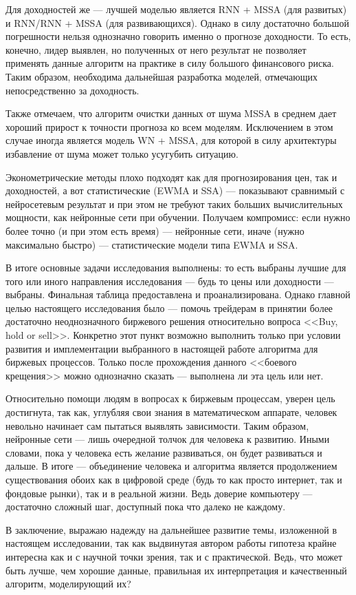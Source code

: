 Для доходностей же --- лучшей моделью является RNN + MSSA (для развитых) и RNN/RNN + MSSA (для развивающихся). Однако в силу достаточно большой погрешности нельзя однозначно говорить именно о прогнозе доходности. То есть, конечно, лидер выявлен, но полученных от него результат не позволяет применять данные алгоритм на практике в силу большого финансового риска. Таким образом, необходима дальнейшая разработка моделей, отмечающих непосредственно за доходность.

Также отмечаем, что алгоритм очистки данных от шума MSSA в среднем дает хороший прирост к точности прогноза ко всем моделям. Исключением в этом случае иногда является модель WN + MSSA, для которой в силу архитектуры избавление от шума может только усугубить ситуацию.

Эконометрические методы плохо подходят как для прогнозирования цен, так и доходностей, а вот статистические (EWMA и SSA) --- показывают сравнимый с нейросетевым результат и при этом не требуют таких больших вычислительных мощности, как нейронные сети при обучении. Получаем компромисс: если нужно более точно (и при этом есть время) --- нейронные сети, иначе (нужно максимально быстро) --- статистические модели типа EWMA и SSA.

В итоге основные задачи исследования выполнены: то есть выбраны лучшие для того или иного направления исследования --- будь то цены или доходности --- выбраны. Финальная таблица предоставлена и проанализирована. Однако главной целью настоящего исследования было --- помочь трейдерам в принятии более достаточно неоднозначного биржевого решения относительно вопроса <<Buy, hold or sell>>. Конкретно этот пункт возможно выполнить только при условии развития и имплементации выбранного в настоящей работе алгоритма для биржевых процессов. Только после прохождения данного <<боевого крещения>> можно однозначно сказать --- выполнена ли эта цель или нет.

Относительно помощи людям в вопросах к биржевым процессам, уверен цель достигнута, так как, углубляя свои знания в математическом аппарате, человек невольно начинает сам пытаться выявлять зависимости. Таким образом, нейронные сети --- лишь очередной толчок для человека к развитию. Иными словами, пока у человека есть желание развиваться, он будет развиваться и дальше. В итоге --- объединение человека и алгоритма является продолжением существования обоих как в цифровой среде (будь то как просто интернет, так и фондовые рынки), так и в реальной жизни. Ведь доверие компьютеру --- достаточно сложный шаг, доступный пока что далеко не каждому.

В заключение, выражаю надежду на дальнейшее развитие темы, изложенной в настоящем исследовании, так как выдвинутая автором работы гипотеза крайне интересна как и с научной точки зрения, так и с практической. Ведь, что может быть лучше, чем хорошие данные, правильная их интерпретация и качественный алгоритм, моделирующий их?

